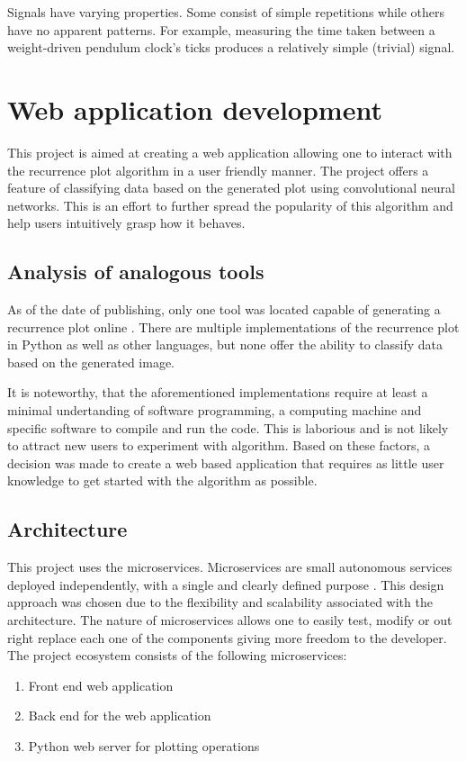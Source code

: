 \documentclass[a4paper,12pt,fleqn]{article}
\begin{document}
Signals have varying properties. Some consist of simple repetitions while others
have no apparent patterns.
For example, measuring the time taken between a weight-driven
pendulum clock's ticks produces a relatively simple (trivial) signal.


\newpage


\section{Web application development}
This project is aimed at creating a web application allowing one to interact with the recurrence plot algorithm in a user friendly manner.
The project offers a feature of classifying data based on the generated plot using convolutional neural networks.
This is an effort to further spread the popularity of this algorithm and help users intuitively grasp how it behaves.


\subsection{Analysis of analogous tools}
As of the date of publishing, only one tool was located capable 
of generating a recurrence plot online \cite{recurrence_plot_tk}. 
There are multiple implementations of the recurrence plot in Python as well as other
languages, but none offer the ability to classify data based on the generated image.

It is noteworthy, that the aforementioned implementations require at least a minimal undertanding of software programming, a computing machine and specific software to compile and run the code. 
This is laborious and is not likely to attract new users to experiment with algorithm.
Based on these factors, a decision was made to create a web based application that requires
as little user knowledge to get started with the algorithm as possible.


\subsection{Architecture}
This project uses the microservices. 
Microservices are small autonomous services deployed independently, with a single and clearly defined purpose \cite{krause2015microservices}. This design approach was chosen due to the flexibility and scalability associated with the architecture. %
The nature of microservices allows one to easily test, modify or out right replace each one of the components giving more freedom to the developer.
The project ecosystem consists of the following microservices:
\begin{enumerate}
	\item Front end web application
	\item Back end for the web application
	\item Python web server for plotting operations
\end{enumerate}
\end{document}
